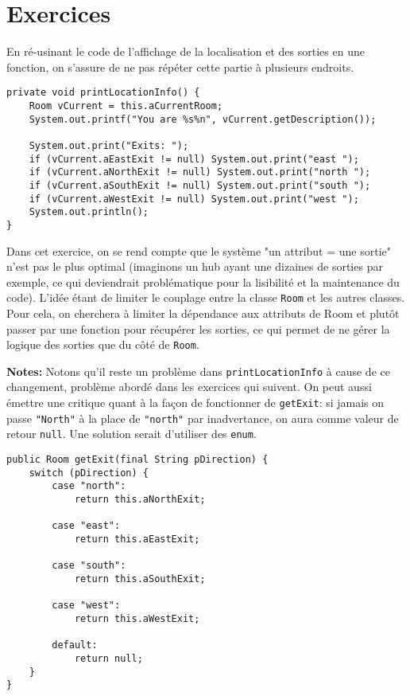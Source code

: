 \chapter{Exercices}

\setcounter{section}{7}
\setcounter{exercise}{4}

\begin{exercise}[subtitle=printLocationInfo]

En ré-usinant le code de l'affichage de la localisation et des sorties en une fonction, on s'assure de ne pas répéter cette partie à plusieurs endroits.

\begin{verbatim}
private void printLocationInfo() {
    Room vCurrent = this.aCurrentRoom;
    System.out.printf("You are %s%n", vCurrent.getDescription());
   
    System.out.print("Exits: ");
    if (vCurrent.aEastExit != null) System.out.print("east ");
    if (vCurrent.aNorthExit != null) System.out.print("north ");
    if (vCurrent.aSouthExit != null) System.out.print("south ");
    if (vCurrent.aWestExit != null) System.out.print("west ");
    System.out.println();
}
\end{verbatim}
\end{exercise}

\begin{exercise}[subtitle=getExit]

Dans cet exercice, on se rend compte que le système "un attribut = une sortie" n'est pas le plus optimal (imaginons un hub ayant une dizaines de sorties par exemple, ce qui deviendrait problématique pour la lisibilité et la maintenance du code). L'idée étant de limiter le couplage entre la classe \verb|Room| et les autres classes. Pour cela, on cherchera à limiter la dépendance aux attributs de Room et plutôt passer par une fonction pour récupérer les sorties, ce qui permet de ne gérer la logique des sorties que du côté de \verb|Room|.

\textbf{Notes:} Notons qu'il reste un problème dans \verb|printLocationInfo| à cause de ce changement, problème abordé dans les exercices qui suivent. On peut aussi émettre une critique quant à la façon de fonctionner de \verb|getExit|: si jamais on passe \verb|"North"| à la place de \verb|"north"| par inadvertance, on aura comme valeur de retour \verb|null|. Une solution serait d'utiliser des \verb|enum|.

\begin{verbatim}
public Room getExit(final String pDirection) {
    switch (pDirection) {
        case "north":
            return this.aNorthExit;

        case "east":
            return this.aEastExit;

        case "south":
            return this.aSouthExit;

        case "west":
            return this.aWestExit;

        default:
            return null;
    }
}
\end{verbatim}
\end{exercise}


